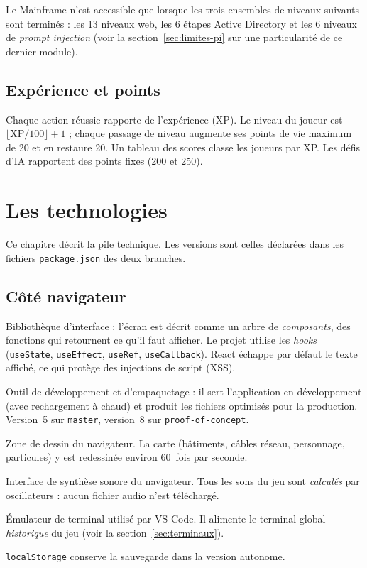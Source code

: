 \documentclass[11pt,a4paper]{report}
\newcommand{\code}[1]{\texttt{\nolinkurl{#1}}}
\newcommand{\file}[1]{\texttt{\nolinkurl{#1}}}
\begin{document}
Le Mainframe n'est accessible que lorsque les trois ensembles de niveaux suivants sont
termin\'es : les 13 niveaux web, les 6 \'etapes Active Directory et les 6 niveaux de
\emph{prompt injection} (voir la section~\ref{sec:limites-pi} sur une particularit\'e de
ce dernier module).

\section{Exp\'erience et points}

Chaque action r\'eussie rapporte de l'exp\'erience (XP). Le niveau du joueur est
$\lfloor \text{XP}/100 \rfloor + 1$ ; chaque passage de niveau augmente ses points de
vie maximum de 20 et en restaure 20. Un tableau des scores classe les joueurs par XP.
Les d\'efis d'IA rapportent des points fixes (200 et 250).

\chapter{Les technologies}
\label{chap:techno}

Ce chapitre d\'ecrit la pile technique. Les versions sont celles d\'eclar\'ees dans les
fichiers \file{package.json} des deux branches.

\section{C\^ot\'e navigateur}

\begin{description}[style=nextline,leftmargin=0.6cm]
  \item[React 18] Biblioth\`eque d'interface : l'écran est d\'ecrit comme un arbre de
        \emph{composants}, des fonctions qui retournent ce qu'il faut afficher. Le
        projet utilise les \emph{hooks} (\texttt{useState}, \texttt{useEffect},
        \texttt{useRef}, \texttt{useCallback}). React \'echappe par d\'efaut le texte
        affich\'e, ce qui prot\`ege des injections de script (XSS).
  \item[Vite] Outil de d\'eveloppement et d'empaquetage : il sert l'application en
        d\'eveloppement (avec rechargement \`a chaud) et produit les fichiers optimis\'es
        pour la production. Version~5 sur \code{master}, version~8 sur
        \code{proof-of-concept}.
  \item[Canvas 2D] Zone de dessin du navigateur. La carte (b\^atiments, c\^ables
        r\'eseau, personnage, particules) y est redessin\'ee environ 60~fois par seconde.
  \item[Web Audio API] Interface de synth\`ese sonore du navigateur. Tous les sons du
        jeu sont \emph{calcul\'es} par oscillateurs : aucun fichier audio n'est
        t\'el\'echarg\'e.
  \item[xterm.js 5] \'Emulateur de terminal utilis\'e par VS Code. Il alimente le
        terminal global \emph{historique} du jeu (voir la
        section~\ref{sec:terminaux}).
  \item[Stockage local] \texttt{localStorage} conserve la sauvegarde dans la version
        autonome.
\end{description}
\end{document}
